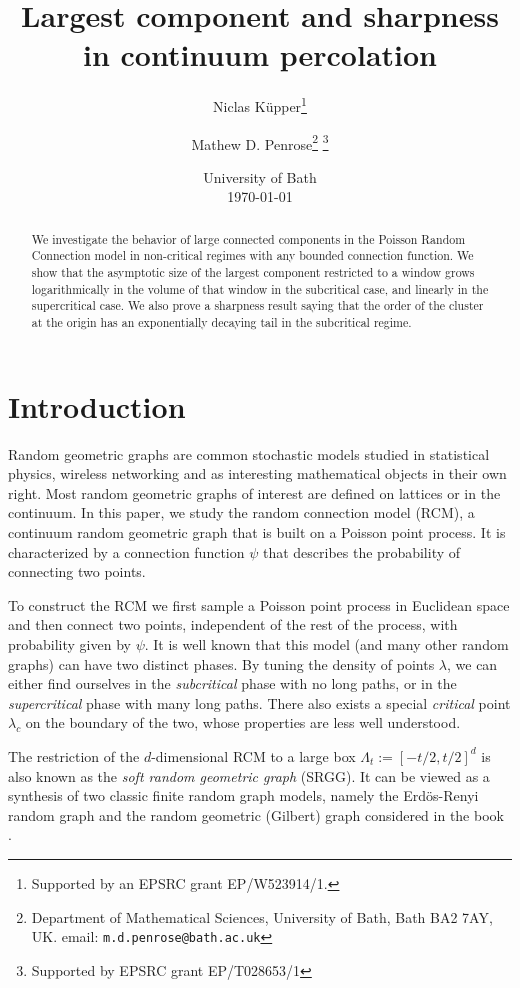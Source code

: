 \documentclass[a4paper,12pt]{scrartcl}
\author{
  Niclas K\"upper\footnote{Supported by an EPSRC grant EP/W523914/1.}
  \and
  Mathew D. Penrose\footnote{Department of Mathematical Sciences, University of Bath, Bath BA2 7AY, UK. email: \texttt{m.d.penrose@bath.ac.uk}}
\footnote{Supported by EPSRC grant EP/T028653/1}}
\date{University of Bath \\
\today}
\title{Largest component and sharpness in  continuum percolation}
\newcommand{\conn}{\psi}
\theoremstyle{definition}
\theoremstyle{remark}
\begin{document}
\maketitle

\begin{abstract}
  We investigate the behavior of large connected components in the
  Poisson Random Connection model in non-critical regimes with any bounded connection function. We show that the asymptotic size of the largest component restricted to a window grows logarithmically in the volume of that window in the subcritical case, and linearly in the supercritical case. We also prove a sharpness result saying
  that the
  order of the cluster at the origin has an exponentially decaying tail in the subcritical regime.
\end{abstract}

\tableofcontents


\section{Introduction} \label{sec:Introduction}
Random geometric graphs are common stochastic models studied in statistical physics, wireless networking and as interesting mathematical objects in their own right. Most random geometric graphs of interest are defined on lattices or in the continuum. In this paper, we study the random connection model (RCM), a continuum random geometric graph that is built on a Poisson point process. It is characterized by a connection function $\conn$ that describes the probability of connecting two points.

To construct the RCM we first sample a Poisson point process in Euclidean space and then connect two points, independent of the rest of the process, with probability given by $\conn$. It is well known that this model (and many other random graphs) can have two distinct phases. By tuning the density of points $\lambda$, we can either find ourselves in the \emph{subcritical} phase with no long paths, or in the \emph{supercritical} phase with many long paths. There also exists a special \emph{critical} point $\lambda_c$  on the boundary of the two, whose properties are less well understood.

The restriction of the  $d$-dimensional RCM to a large box
$\Lambda_t := [-t/2, t/2]^d$ is also known as the
{\em soft random geometric graph} (SRGG). It can be viewed as a synthesis
of two classic finite random graph models, namely
the Erd\"os-Renyi random graph and the random geometric (Gilbert)
graph considered in the book \cite{penrose2003random}.
\end{document}
